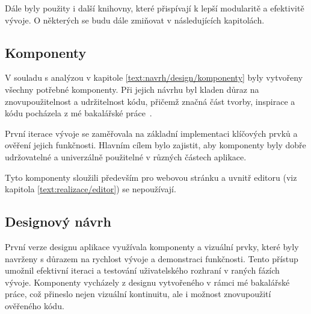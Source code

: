 Dále byly použity i další knihovny, které přispívají k lepší modularitě a efektivitě vývoje.
O některých se budu dále zmiňovat v následujících kapitolách.



\subsection{Komponenty}

V souladu s analýzou v kapitole \ref{text:navrh/design/komponenty} byly vytvořeny všechny potřebné komponenty. 
Při jejich návrhu byl kladen důraz na znovupoužitelnost a udržitelnost kódu, přičemž značná část tvorby, inspirace a kódu pocházela z mé bakalářské práce~\cite{cajthaml_bp}.

První iterace vývoje se zaměřovala na základní implementaci klíčových prvků a ověření jejich funkčnosti. 
Hlavním cílem bylo zajistit, aby komponenty byly dobře udržovatelné a univerzálně použitelné v různých částech aplikace.

Tyto komponenty sloužili především pro webovou stránku a uvnitř editoru (viz kapitola \ref{text:realizace/editor}) se nepoužívají.


\subsection{Designový návrh}

První verze designu aplikace využívala komponenty a vizuální prvky, které byly navrženy s důrazem na rychlost vývoje a demonstraci funkčnosti. 
Tento přístup umožnil efektivní iteraci a testování uživatelského rozhraní v raných fázích vývoje.
Komponenty vycházely z designu vytvořeného v rámci mé bakalářské práce, což přineslo nejen vizuální kontinuitu, ale i možnost znovupoužití ověřeného kódu.

